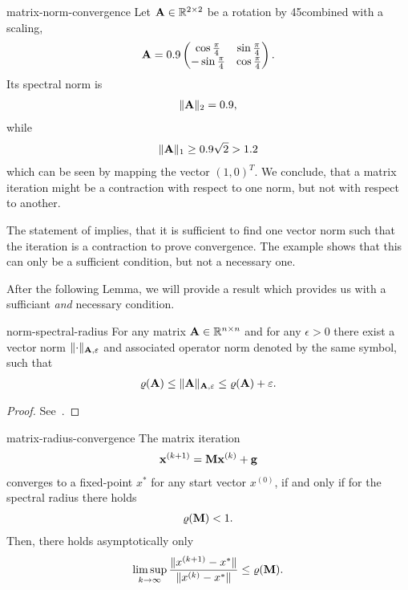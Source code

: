 \begin{Example}{matrix-norm-convergence}
  Let $\mathbf A\in\mathbb R^{2\times 2}$ be a rotation by 45\textdegree combined
  with a scaling,
  \begin{gather}
    \mathbf A = 0.9
    \begin{pmatrix}
      \cos \tfrac\pi4 &\sin\tfrac\pi4\\
      -\sin\tfrac\pi4&\cos\tfrac\pi4
    \end{pmatrix}.
  \end{gather}
  Its spectral norm is
  \begin{gather}
    \lVert\mathbf A\rVert_2 = 0.9,
  \end{gather}
  while
  \begin{gather}
    \lVert\mathbf A\rVert_1 \ge 0.9\sqrt2 > 1.2
  \end{gather}
  which can be seen by mapping the vector $(1,0)^T$. We conclude, that
  a matrix iteration might be a contraction with respect to one norm,
  but not with respect to another.
\end{Example}

\begin{remark}
  The statement of 
  implies, that it is sufficient to find one vector norm such that the
  iteration is a contraction to prove convergence. The example shows
  that this can only be a sufficient condition, but not a necessary
  one.

  After the following Lemma, we will provide a result which provides us
  with a sufficiant \emph{and} necessary condition.
\end{remark}

\begin{Lemma}{norm-spectral-radius}
  For any matrix $\mathbf A\in\mathbb R^{n\times n}$ and for any $\epsilon>0$ there exist a
  vector norm $\lVert\cdot\rVert_{\mathbf A,\varepsilon}$ and associated operator norm
  denoted by the same symbol, such that
  \begin{gather}
    \varrho(\mathbf A) \le \lVert\mathbf A\rVert_{\mathbf A,\varepsilon} \le \varrho(\mathbf A)+\varepsilon.
  \end{gather}
\end{Lemma}

\begin{proof}
  See~\cite[Lemma 3.1]{Rannacher18nla}.
\end{proof}

\begin{Theorem}{matrix-radius-convergence}
  The matrix iteration
  \begin{gather}
    \mathbf x^{(k+1)} = \mathbf M \mathbf x^{(k)} + \mathbf g
  \end{gather}
  converges to a fixed-point $x^*$ for any start vector $x^{(0)}$,
  if and only if for the spectral radius there holds
  \begin{gather}
    \varrho(\mathbf M) < 1.
  \end{gather}
  Then, there holds asymptotically only
  \begin{gather}
    \operatorname*{lim\,sup}_{k\to\infty} \frac{\lVert x^{(k+1)}-x^*\rVert}{\lVert x^{(k)}-x^*\rVert}
    \le \varrho(\mathbf M).
  \end{gather}
\end{Theorem}

